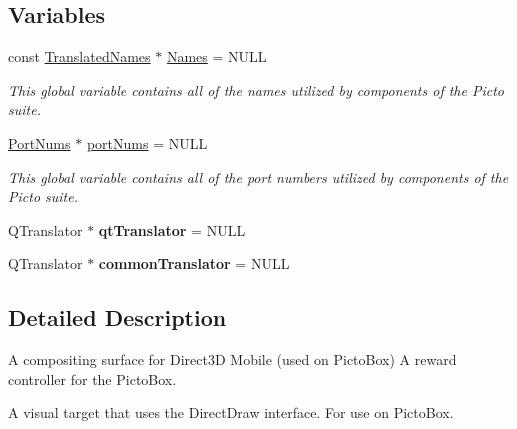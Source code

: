 \subsection*{Variables}
\begin{DoxyCompactItemize}
\item 
\hypertarget{namespace_picto_ad59e27b6e397e94be37204bbc9ec30bb}{const \hyperlink{class_picto_1_1_translated_names}{Translated\-Names} $\ast$ \hyperlink{namespace_picto_ad59e27b6e397e94be37204bbc9ec30bb}{Names} = N\-U\-L\-L}\label{namespace_picto_ad59e27b6e397e94be37204bbc9ec30bb}

\begin{DoxyCompactList}\small\item\em This global variable contains all of the names utilized by components of the Picto suite. \end{DoxyCompactList}\item 
\hypertarget{namespace_picto_af725c148077b6844334e9e366a8ba639}{\hyperlink{class_picto_1_1_port_nums}{Port\-Nums} $\ast$ \hyperlink{namespace_picto_af725c148077b6844334e9e366a8ba639}{port\-Nums} = N\-U\-L\-L}\label{namespace_picto_af725c148077b6844334e9e366a8ba639}

\begin{DoxyCompactList}\small\item\em This global variable contains all of the port numbers utilized by components of the Picto suite. \end{DoxyCompactList}\item 
\hypertarget{namespace_picto_a8081c6772ac451ac21a616135efe3d74}{Q\-Translator $\ast$ {\bfseries qt\-Translator} = N\-U\-L\-L}\label{namespace_picto_a8081c6772ac451ac21a616135efe3d74}

\item 
\hypertarget{namespace_picto_ad76a575de7762544bae918b42eefa260}{Q\-Translator $\ast$ {\bfseries common\-Translator} = N\-U\-L\-L}\label{namespace_picto_ad76a575de7762544bae918b42eefa260}

\end{DoxyCompactItemize}


\subsection{Detailed Description}
A compositing surface for Direct3\-D Mobile (used on Picto\-Box) A reward controller for the Picto\-Box.

A visual target that uses the Direct\-Draw interface. For use on Picto\-Box.

